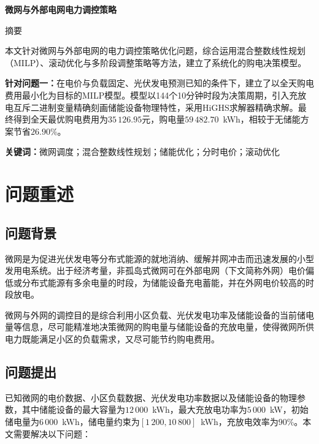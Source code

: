 \documentclass[12pt,a4paper]{ctexart}
\theoremstyle{definition}
\theoremstyle{plain}
\theoremstyle{remark}
\renewenvironment{abstract}
  {\begin{center}\heiti\zihao{-3}摘\quad 要\end{center}\zihao{-4}\songti\indent}
  {\par\vspace{1em}}
\newcommand{\keywords}[1]{%
  \par\noindent\textbf{关键词：}#1}
\begin{document}
\pagestyle{plain}

\begin{center}
{\heiti\bfseries 微网与外部电网电力调控策略}
\end{center}
\vspace{1em}

\setcounter{page}{1}

\begin{abstract}
本文针对微网与外部电网的电力调控策略优化问题，综合运用混合整数线性规划（MILP）、滚动优化与多阶段调整策略等方法，建立了系统化的购电决策模型。

\textbf{针对问题一：}在电价与负载固定、光伏发电预测已知的条件下，建立了以全天购电费用最小化为目标的MILP模型。模型以144个10分钟时段为决策周期，引入充放电互斥二进制变量精确刻画储能设备物理特性，采用HiGHS求解器精确求解。最终得到全天最优购电费用为$35\,126.95$元，购电量$59\,482.70$~kWh，相较于无储能方案节省$26.90\%$。

\end{abstract}

\keywords{微网调度；混合整数线性规划；储能优化；分时电价；滚动优化}


\section{问题重述}

\subsection{问题背景}
微网是为促进光伏发电等分布式能源的就地消纳、缓解并网冲击而迅速发展的小型发用电系统。出于经济考量，非孤岛式微网可在外部电网（下文简称外网）电价偏低或分布式能源有多余电量的时段，为储能设备充电蓄能，并在外网电价较高的时段放电。

微网与外网的调控目的是综合利用小区负载、光伏发电功率及储能设备的当前储电量等信息，尽可能精准地决策微网的购电量与储能设备的充放电量，使得微网所供电力既能满足小区的负载需求，又尽可能节约购电费用。
\subsection{问题提出}

已知微网的电价数据、小区负载数据、光伏发电功率数据以及储能设备的物理参数，其中储能设备的最大容量为$12\,000$~kWh，最大充放电功率为$5\,000$~kW，初始储电量为$6\,000$~kWh，储电量约束为$[1\,200, 10\,800]$~kWh，充放电效率为$90\%$。本文需要解决以下问题：
\end{document}
